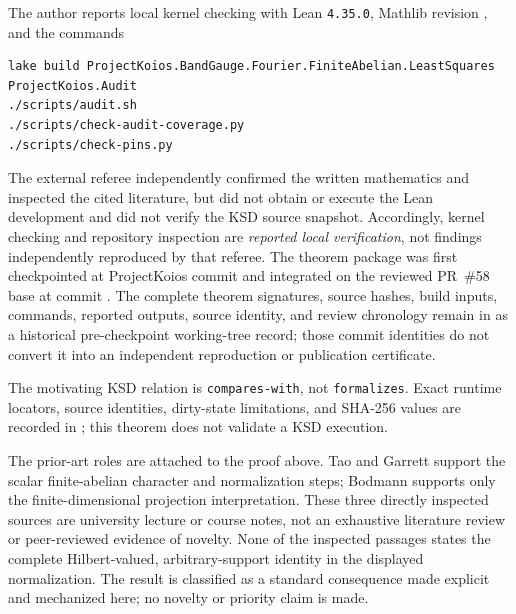 \documentclass[11pt]{article}
\begin{document}
The author reports local kernel checking with Lean \texttt{4.35.0}, Mathlib revision
, and the commands
\begin{verbatim}
lake build ProjectKoios.BandGauge.Fourier.FiniteAbelian.LeastSquares ProjectKoios.Audit
./scripts/audit.sh
./scripts/check-audit-coverage.py
./scripts/check-pins.py
\end{verbatim}
The external referee independently confirmed the written mathematics and inspected the cited
literature, but did not obtain or execute the Lean development and did not verify the KSD source
snapshot.  Accordingly, kernel checking and repository inspection are \emph{reported local
verification}, not findings independently reproduced by that referee.  The theorem package was
first checkpointed at ProjectKoios commit
 and integrated on the reviewed PR~\#58 base at
commit .  The complete theorem signatures, source
hashes, build inputs, commands, reported outputs, source identity, and review chronology remain in
 as a historical
pre-checkpoint working-tree record; those commit identities do not convert it into an independent
reproduction or publication certificate.

The motivating KSD relation is \texttt{compares-with}, not \texttt{formalizes}.  Exact runtime
locators, source identities, dirty-state limitations, and SHA-256 values are recorded in
; this theorem does not
validate a KSD execution.

The prior-art roles are attached to the proof above.  Tao and Garrett support the scalar
finite-abelian character and normalization steps; Bodmann supports only the finite-dimensional
projection interpretation.  These three directly inspected sources are university lecture or
course notes, not an exhaustive literature review or peer-reviewed evidence of novelty.  None of
the inspected passages states the complete Hilbert-valued, arbitrary-support identity in the
displayed normalization.  The result is classified as a standard consequence made explicit and
mechanized here; no novelty or priority claim is made.
\end{document}
